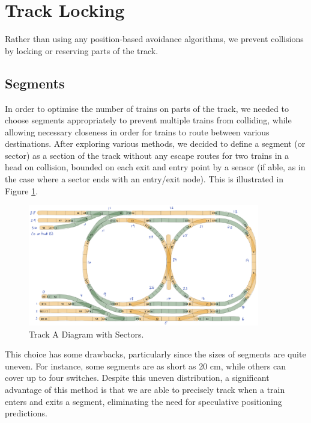 \documentclass[12pt, titlepage]{article}
\begin{document}
    \section{Track Locking}
    \label{sec:locking}
    
    Rather than using any position-based avoidance algorithms, we prevent collisions by locking or reserving parts of the track.
    
    \subsection{Segments}
    
    In order to optimise the number of trains on parts of the track, we needed to choose segments appropriately to prevent multiple trains from colliding, while allowing necessary closeness in order for trains to route between various destinations. After exploring various methods, we decided to define a segment (or sector) as a section of the track without any escape routes for two trains in a head on collision, bounded on each exit and entry point by a sensor (if able, as in the case where a sector ends with an entry/exit node). This is illustrated in Figure \ref{fig:sectors}.
    \begin{figure}[h]
        \centering
        \includegraphics[width=0.9\textwidth]{nice-track-sectors}
        \caption{Track A Diagram with Sectors.}
        \label{fig:sectors}
    \end{figure}
    
    This choice has some drawbacks, particularly since the sizes of segments are quite uneven. For instance, some segments are as short as 20 cm, while others can cover up to four switches. Despite this uneven distribution, a significant advantage of this method is that we are able to precisely track when a train enters and exits a segment, eliminating the need for speculative positioning predictions.
    
\end{document}
